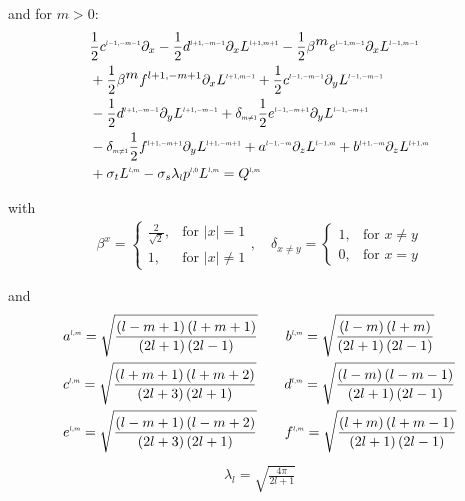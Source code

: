 \documentclass[10pt]{scrartcl}
\begin{document}
and for $m>0$:
\begin{align}
&
\frac{1}{2}c^{\scaleto{l-1,-m-1}{4pt}}\partial_x 
-\frac{1}{2}d^{\scaleto{l+1,-m-1}{4pt}}\partial_x L^{\scaleto{l+1,m+1}{4pt}}
-\frac{1}{2}\beta^{\scaleto{m}{4pt}}e^{\scaleto{l-1,m-1}{4pt}}\partial_x L^{\scaleto{l-1,m-1}{4pt}}
\nonumber
\\&
+\frac{1}{2}\beta^{\scaleto{m}{4pt}}f^{l+1,-m+1}\partial_x L^{\scaleto{l+1,m-1}{4pt}}
+\frac{1}{2}c^{\scaleto{l-1,-m-1}{4pt}}\partial_y L^{\scaleto{l-1,-m-1}{4pt}}
\nonumber
\\&
-\frac{1}{2}d^{\scaleto{l+1,-m-1}{4pt}}\partial_y L^{\scaleto{l+1,-m-1}{4pt}}
+\delta_{\scaleto{m\neq 1}{4pt}}\frac{1}{2}e^{\scaleto{l-1,-m+1}{4pt}}\partial_y L^{\scaleto{l-1,-m+1}{4pt}}
\nonumber
\\&
-\delta_{\scaleto{m\neq 1}{4pt}}\frac{1}{2}f^{\scaleto{l+1,-m+1}{4pt}}\partial_y L^{\scaleto{l+1,-m+1}{4pt}}
+a^{\scaleto{l-1,-m}{4pt}}\partial_z L^{\scaleto{l-1,m}{4pt}}
+b^{\scaleto{l+1,-m}{4pt}}\partial_z L^{\scaleto{l+1,m}{4pt}}
\nonumber
\\&
+\sigma_t L^{\scaleto{l,m}{4pt}}
-\sigma_s\lambda_{\scaleto{l}{4pt}}p^{\scaleto{l,0}{4pt}}L^{\scaleto{l,m}{4pt}}
= Q^{\scaleto{l,m}{4pt}}
\end{align}



with
\begin{align*}
\beta^{x}=
\left\{
\begin{array}{ll}
\frac{2}{\sqrt{2}}, & \text{for } \vert x\vert = 1\\
1, & \text{for } \vert x\vert \neq 1
\end{array}
\right.
,\quad
\delta_{x\neq y}=
\left\{
\begin{array}{ll}
1, & \text{for } x \neq y\\
0, & \text{for } x = y
\end{array}
\right.
\end{align*}

and
\begin{align*}
&
a^{\scaleto{l,m}{4pt}}= \sqrt{\frac{\left(l-m+1\right)\left(l+m+1\right)}{\left(2l+1\right)\left(2l-1\right)}} \qquad
b^{\scaleto{l,m}{4pt}}= \sqrt{\frac{\left(l-m\right)\left(l+m\right)}{\left(2l+1\right)\left(2l-1\right)}}
\\&
c^{\scaleto{l,m}{4pt}}= \sqrt{\frac{\left(l+m+1\right)\left(l+m+2\right)}{\left(2l+3\right)\left(2l+1\right)}} \qquad
d^{\scaleto{l,m}{4pt}}= \sqrt{\frac{\left(l-m\right)\left(l-m-1\right)}{\left(2l+1\right)\left(2l-1\right)}}
\\&
e^{\scaleto{l,m}{4pt}}= \sqrt{\frac{\left(l-m+1\right)\left(l-m+2\right)}{\left(2l+3\right)\left(2l+1\right)}} \qquad
f^{\scaleto{l,m}{4pt}}= \sqrt{\frac{\left(l+m\right)\left(l+m-1\right)}{\left(2l+1\right)\left(2l-1\right)}}
\end{align*}
\begin{align*}
\lambda_l=\sqrt{\frac{4\pi}{2l+1}}
\end{align*}
\end{document}
